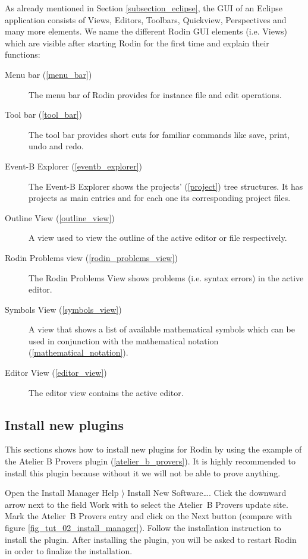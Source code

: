 As already mentioned in Section \ref{subsection_eclipse}, the GUI of an Eclipse application consists of Views, Editors, Toolbars, Quickview, Perspectives and many more elements. We name the different Rodin GUI elements (i.e. Views) which are visible after starting Rodin for the first time and explain their functions:

\begin{description}
	\item[Menu bar (\ref{menu_bar})] The menu bar of Rodin provides for instance file and edit operations.
	\item[Tool bar (\ref{tool_bar})] The tool bar provides short cuts for familiar commands like save, print, undo and redo.
	\item[Event-B Explorer (\ref{eventb_explorer})] The Event-B Explorer shows the projects' (\ref{project}) tree structures. It has projects as main entries and for each one its corresponding project files.
	\item[Outline View (\ref{outline_view})] A view used to view the outline of the active editor or file respectively.
	\item[Rodin Problems view (\ref{rodin_problems_view})] The Rodin Problems View shows problems (i.e. syntax errors) in the active editor.
	\item[Symbols View (\ref{symbols_view})] A view that shows a list of available mathematical symbols which can be used in conjunction with the mathematical notation (\ref{mathematical_notation}).
	\item[Editor View (\ref{editor_view})] The editor view contains the active editor.
\end{description}

\subsection{Install new plugins}

This sections shows how to install new plugins for Rodin by using the example of the Atelier B Provers plugin (\ref{atelier_b_provers}). It is highly recommended to install this plugin because without it we will not be able to prove anything.

Open the Install Manager \textsf{Help $\rangle$ Install New Software\ldots}. Click the downward arrow next to the field \textsf{Work with} to select the Atelier~B Provers update site. Mark the Atelier~B Provers entry and click on the \textsf{Next} button (compare with figure \ref{fig_tut_02_install_manager}). Follow the installation instruction to install the plugin. After installing the plugin, you will be asked to restart Rodin in order to finalize the installation.


